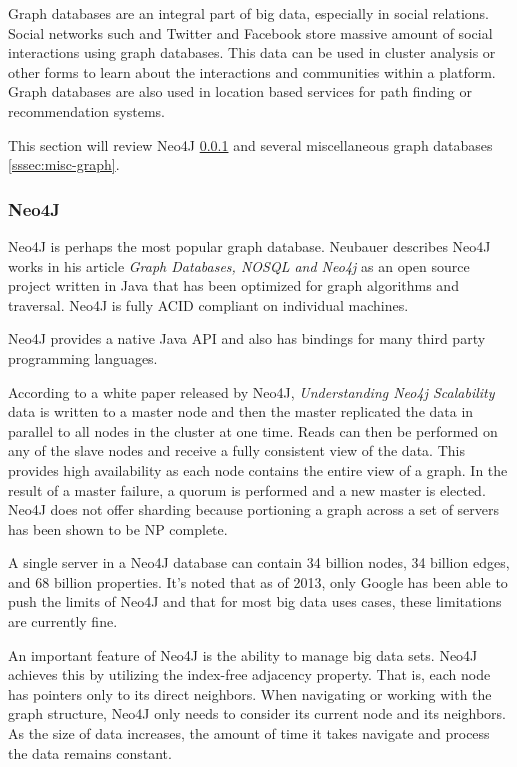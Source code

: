 \documentclass[]{article}
\begin{document}
Graph databases are an integral part of big data, especially in social relations. Social networks such and Twitter and Facebook store massive amount of social interactions using graph databases. This data can be used in cluster analysis or other forms to learn about the interactions and communities within a platform. Graph databases are also used in location based services for path finding or recommendation systems\cite{cattell_scalable_2011}.

This section will review Neo4J \ref{sssec:neo4j} and several miscellaneous graph databases \ref{sssec:misc-graph}. 

\subsubsection{Neo4J}\label{sssec:neo4j}
Neo4J is perhaps the most popular graph database. Neubauer describes Neo4J works in his article \textit{Graph Databases, NOSQL and Neo4j}\cite{neubauer_2010} as an open source project written in Java that has been optimized for graph algorithms and traversal. Neo4J is fully ACID compliant on individual machines.

Neo4J provides a native Java API and also has bindings for many third party programming languages.

According to a white paper released by Neo4J, \textit{Understanding Neo4j Scalability}\cite{montag2013understanding} data is written to a master node and then the master replicated the data in parallel to all nodes in the cluster at one time. Reads can then be performed on any of the slave nodes and receive a fully consistent view of the data. This provides high availability as each node contains the entire view of a graph. In the result of a master failure, a quorum is performed and a new master is elected. Neo4J does not offer sharding because portioning a graph across a set of servers has been shown to be NP complete.

A single server in a Neo4J database can contain 34 billion nodes, 34 billion edges, and 68 billion properties. It's noted that as of 2013, only Google has been able to push the limits of Neo4J and that for most big data uses cases, these limitations are currently fine.

An important feature of Neo4J is the ability to manage big data sets. Neo4J achieves this by utilizing the index-free adjacency property. That is, each node has pointers only to its direct neighbors. When navigating or working with the graph structure, Neo4J only needs to consider its current node and its neighbors. As the size of data increases, the amount of time it takes navigate and process the data remains constant. 
\end{document}
